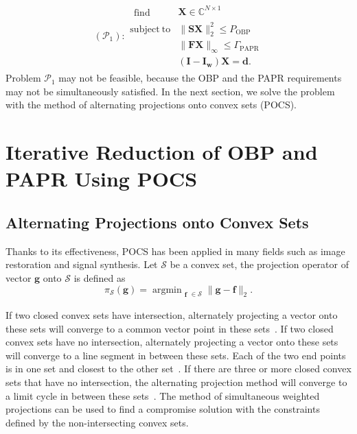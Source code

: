 \documentclass[paper]{ieice}
\begin{document}
\begin{eqnarray}
(\mathcal{P}_1):
\begin{array}{ll}
\begin{split}
\mathop{\mathrm{find}}
\end{split}  
& \mathbf{X} \in \mathbb{C}^{N \times 1} \\
\mathrm{subject~to} & \|\mathbf{S}\mathbf{X} \|_{2}^2 \leq P_{\mathrm{OBP}} \\
& \| \mathbf{F}\mathbf{X}\|_{\infty} \leq \Gamma_{\mathrm{PAPR}} \\
&(\mathbf{I}-\mathbf{I}_{\mathbf{w}})\mathbf{X} = \mathbf{d}.
\end{array}
\end{eqnarray}
Problem $\mathcal{P}_1$ may not be feasible, because the OBP and the PAPR requirements may not be simultaneously satisfied.  In the next section, we solve the problem with the method of alternating projections onto convex sets (POCS).

\section{Iterative Reduction of OBP and PAPR Using POCS} \label{sec: Algorithms based on pocs}

\subsection{Alternating Projections onto Convex Sets}

Thanks to its effectiveness, POCS has been applied in many fields such as image restoration and signal synthesis.  Let $\mathcal{S}$ be a convex set, the projection operator of vector $\mathbf{g}$ onto $\mathcal{S}$ is defined as
\begin{equation}
\pi_{\mathcal{S}}(\mathbf{g}) = \mathop{\mathrm{argmin}}_{\substack{\mathbf{f}}\in \mathcal{S}} \|\mathbf{g}-\mathbf{f}\|_2.
\end{equation}

If two closed convex sets have intersection, alternately projecting a vector onto these sets will converge to a common vector point in these sets~\cite{youla1982image}.  If two closed convex sets have no intersection, alternately projecting a vector onto these sets will converge to a line segment in between these sets.  Each of the two end points is in one set and closest to the other set~\cite{goldburg_signal_1985,Marks_book}.   If there are three or more closed convex sets that have no intersection, the alternating projection method will converge to a limit cycle in between these sets~\cite{youla_extensions_1986,Marks_book}.  The method of simultaneous weighted projections can be used to find a compromise solution with the constraints defined by the non-intersecting convex sets.
\end{document}
